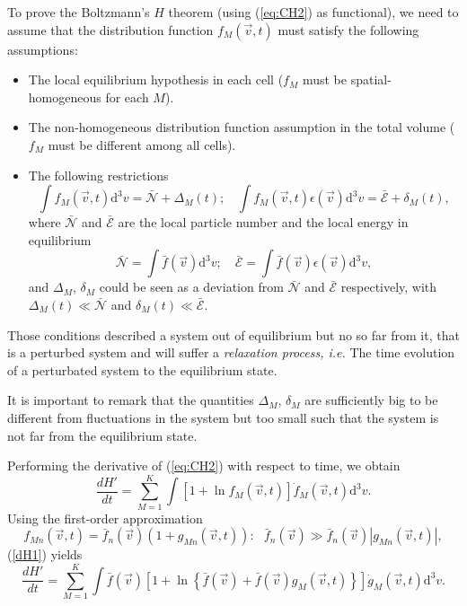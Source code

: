 To prove the Boltzmann's $H$ theorem (using (\ref{eq:CH2}) as functional), we need
to assume that the distribution function $f_M(\vec{v},t)$ must satisfy the
following assumptions:
%
\begin{itemize}
  \item The local equilibrium hypothesis in each cell ($f_{M}$ must be
    spatial-homogeneous for each $M$).
  \item The non-homogeneous distribution function assumption in the total
    volume ($f_{M}$ must be different among all cells).
  \item The following restrictions
    \begin{equation}\label{restrictionoutsideclassical}
      \int f_{M}(\vec{v},t) \mathrm{d}^{3}v=
      \bar{\mathcal{N}}+\Delta_M(t); \ \ \ \ 
      \int f_{M}(\vec{v},t) \epsilon(\vec{v}) \mathrm{d}^{3}v=
      \bar{\mathcal{E}}+ \delta_M(t),
    \end{equation}
    where $\bar {\mathcal{N}}$ and $\bar{\mathcal{E}}$ are
    the local particle number and the local energy in equilibrium
    \begin{equation}
      \bar{\mathcal{N}}=
      \int \bar{f}(\vec{v}) \mathrm{d}^{3}v ; \quad
      \bar{\mathcal{E}}=
      \int \bar{f}(\vec{v})\epsilon(\vec{v}) \mathrm{d}^{3}v,
    \end{equation}
    and $\Delta_M$, $\delta_M$ could be seen as a deviation from
    $\bar{\mathcal{N}}$ and $\bar{\mathcal{E}}$ respectively,
    with $\Delta_M(t)\ll\bar{\mathcal{N}}$ and
    $\delta_M(t)\ll\bar{\mathcal{E}}$.
\end{itemize} 
%
Those conditions described a system out of equilibrium but no so far from it,
that is a perturbed system and will suffer a \textit{relaxation process, i.e.}
The time evolution of a perturbated system to the equilibrium state.

It is important to remark that the quantities $\Delta_M$, $\delta_M$ are
sufficiently big to be different from fluctuations in the system but too small
such that the system is not far from the equilibrium state.  

Performing the derivative of (\ref{eq:CH2}) with respect to time, we obtain
%
\begin{equation}\label{dH1}
    \frac{dH'}{dt}=\sum_{M=1}^{K}\int\left[
      1+\ln f_M(\vec{v},t)
    \right]\dot f_M(\vec{v},t)\mathrm{d}^3v.
\end{equation}
%
Using the first-order approximation
%
\begin{equation}\label{firstorder}
   f_{Mn}(\vec{v},t)=\bar{f}_{n}(\vec{v})(1+g_{Mn}(\vec{v},t)): \ \ \ 
   \bar{f}_{n}(\vec{v})\gg \bar{f}_{n}(\vec{v})|g_{Mn}(\vec{v},t)|,
\end{equation}
%
(\ref{dH1}) yields
%
\begin{equation}\label{dH1-1}
    \frac{dH'}{dt}=\sum_{M=1}^{K}\int\bar f(\vec{v}) \left[
      1+\ln \left\{
        \bar f(\vec{v})+\bar f(\vec{v})g_M(\vec{v},t)
      \right\}
    \right]\dot g_M(\vec{v},t)\mathrm{d}^3v.
\end{equation}
%

